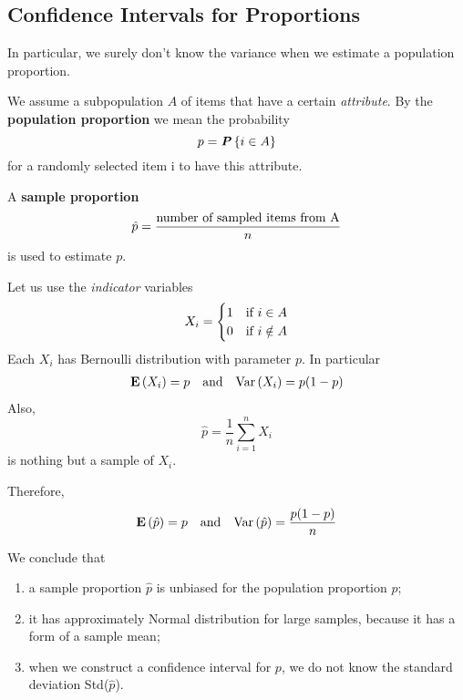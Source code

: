 \subsection{Confidence Intervals for Proportions}
\label{subsec:conf-inter-for-proportions}

In particular, we surely don't know the variance when we estimate a population proportion.
\begin{definition}{}
  We assume a subpopulation $A$ of items that have a certain \textit{attribute}. By the \textbf{population proportion} we mean the probability
  \begin{equation*}
    p = \textbf{\textit{P}}\left\{i \in A\right\}
  \end{equation*}
  for a randomly selected item i to have this attribute.

  A \textbf{sample proportion}
  \begin{equation*}
    \hat{p} = \frac{\textnormal{number of sampled items from A}}{n}
  \end{equation*}
  is used to estimate $p$.
\end{definition}
\noindent Let us use the \textit{indicator} variables
\begin{equation*}
  X_i = \begin{cases}
    1 &\textnormal{if } i \in A\\
    0 &\textnormal{if } i \notin A\\
  \end{cases}
\end{equation*}
Each $X_i$ has Bernoulli distribution with parameter $p$. In particular
\begin{align*}
  \mathbf{E}\left(X_i\right) = p &&\textnormal{and}& &\text{Var}\left( X_i \right) = p (1 - p)
\end{align*}
Also,
\begin{equation*}
  \hat{p} = \frac{1}{n} \sum_{i=1}^{n} X_i
\end{equation*}
is nothing but a sample of $X_i$.

\noindent Therefore,
\begin{align*}
  \mathbf{E}\left(\hat{p}\right) = p &&\textnormal{and}& &\text{Var}\left( \hat{p} \right) = \frac{p (1 - p)}{n}
\end{align*}

\vspace*{\fill}
\columnbreak

\noindent We conclude that
\begin{enumerate}
  \item a sample proportion $\hat{p}$ is unbiased for the population proportion $p$;
  \item it has approximately Normal distribution for large samples, because it has a form of
  a sample mean;
  \item when we construct a confidence interval for $p$, we do not know the standard deviation
  Std($\hat{p}$).
\end{enumerate}


